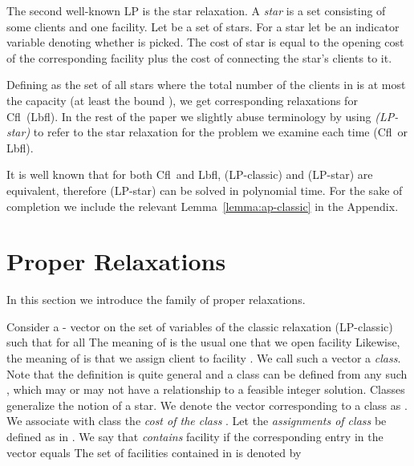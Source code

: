 \documentclass[11pt]{article}\usepackage{amsmath}
\newcommand{\lbfl}{{\sc Lbfl}}
\newcommand{\cfl}{{\sc Cfl}}
\begin{document}
The second well-known LP  is the star relaxation.
A {\em star} is a set consisting of some  clients and
one facility. Let  be a set of stars. For a star   let   be an indicator variable denoting
whether   is picked.   The cost   of star    is equal
to the opening cost of the corresponding facility plus the cost of
connecting the star's clients to it. 

 

\iffalse    

 \fi

Defining  as the set of all stars  where  the total number of the clients in  
is at most the
capacity  (at least the bound ),  we get corresponding relaxations for
  \cfl\ (\lbfl).
In the rest of the paper we  slightly abuse terminology by 
using    {\em (LP-star)}  to refer to the
star relaxation for the problem we examine each time (\cfl\  or \lbfl).

It is well known  that for both \cfl\ and \lbfl, (LP-classic) and (LP-star) are
equivalent, therefore (LP-star) can be solved in  polynomial time.
 For
the sake of completion we include the relevant 
Lemma~\ref{lemma:ap-classic} in the Appendix. 








\section{Proper Relaxations}     \label{sec:firstfamily}

In this section  we introduce  the family of  proper relaxations.

Consider a   -  vector on the set of
 variables  of the  classic  relaxation (LP-classic)
such that  for all   The meaning  of
  is the usual one that
 we open facility   Likewise, the meaning of  is
 that we assign client  to facility . We call such a vector a 
 \emph{class}. Note that  the definition is quite general  and a class
 can be defined  from any such , which may or  may not have a
 relationship  to a  feasible  integer solution.  
Classes generalize the notion of a star. 
We  denote the  vector
 corresponding  to a  class   as .  We  associate with
 class     the  {\em cost   of  the  class}   . Let the {\em assignments of class}  be defined as 
  in .
We say that  {\em contains}  facility  if the corresponding entry
  in the vector  equals   
The set of facilities contained in  is denoted by 
  
\end{document}
